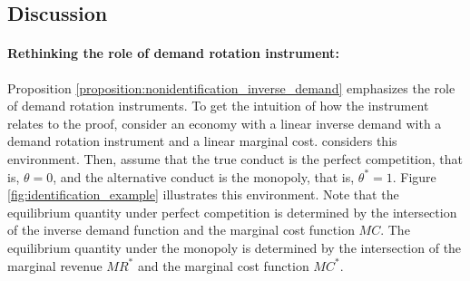 \documentclass[11pt, a4paper]{article}
\begin{document}
\subsection{Discussion}\label{subsec:discussion}
\paragraph{Rethinking the role of demand rotation instrument:}
Proposition \ref{proposition:nonidentification_inverse_demand} emphasizes the role of demand rotation instruments.
To get the intuition of how the instrument relates to the proof, consider an economy with a linear inverse demand with a demand rotation instrument and a linear marginal cost.
\citet{bresnahanOligopoly1982} considers this environment.
Then, assume that the true conduct is the perfect competition, that is, $\theta = 0$, and the alternative conduct is the monopoly, that is, $\theta^{*} = 1$.
Figure \ref{fig:identification_example} illustrates this environment.
Note that the equilibrium quantity under perfect competition is determined by the intersection of the inverse demand function and the marginal cost function $MC$.
The equilibrium quantity under the monopoly is determined by the intersection of the marginal revenue $MR^{*}$ and the marginal cost function $MC^{*}$.
\end{document}
